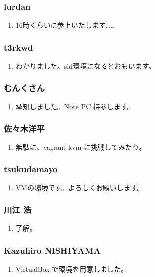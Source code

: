 \documentclass[cjk,dvipdfmx,10pt,compress,%
hyperref={bookmarks=true,bookmarksnumbered=true,bookmarksopen=false,%
colorlinks=false,%
pdftitle={第 108 回 関西 Debian 勉強会},%
pdfauthor={倉敷・のがた・佐々木・かわだ},%
pdfsubject={資料},%
}]{beamer}
\begin{document}

\begin{frame}
  \frametitle{ lurdan }
  \begin{enumerate}
  \item 16時くらいに参上いたします……
  \end{enumerate}
\end{frame}

\begin{frame}
  \frametitle{ t3rkwd }
  \begin{enumerate}
  \item わかりました。sid環境になるとおもいます。
  \end{enumerate}
\end{frame}

\begin{frame}
  \frametitle{ むんくさん }
  \begin{enumerate}
  \item 承知しました。Note PC 持参します。
  \end{enumerate}
\end{frame}

\begin{frame}
  \frametitle{ 佐々木洋平 }
  \begin{enumerate}
  \item 無駄に、vagrant-kvm に挑戦してみたり。
  \end{enumerate}
\end{frame}

\begin{frame}
  \frametitle{ tsukudamayo }
  \begin{enumerate}
  \item VMの環境です。よろしくお願いします。
  \end{enumerate}
\end{frame}

\begin{frame}
  \frametitle{ 川江 浩 }
  \begin{enumerate}
  \item 了解。
  \end{enumerate}
\end{frame}

\begin{frame}
  \frametitle{ Kazuhiro NISHIYAMA }
  \begin{enumerate}
  \item VirtualBox で環境を用意しました。
  \end{enumerate}
\end{frame}
\end{document}
